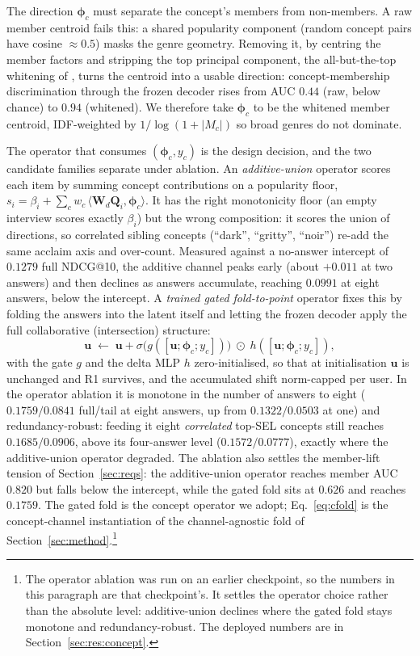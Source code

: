 \documentclass[manuscript,screen,review]{acmart}
\newcommand{\Q}{\mathbf{Q}}
\newcommand{\W}{\mathbf{W}}
\newcommand{\uu}{\mathbf{u}}
\newcommand{\bphi}{\boldsymbol{\phi}}
\begin{document}
The direction $\bphi_c$ must separate the concept's members from non-members. A raw member centroid fails this: a shared popularity component (random concept pairs have cosine $\approx 0.5$) masks the genre geometry. Removing it, by centring the member factors and stripping the top principal component, the all-but-the-top whitening of \citet{mu2018allbutthetop}, turns the centroid into a usable direction: concept-membership discrimination through the frozen decoder rises from AUC $0.44$ (raw, below chance) to $0.94$ (whitened). We therefore take $\bphi_c$ to be the whitened member centroid, IDF-weighted by $1/\log(1+|M_c|)$ so broad genres do not dominate.

The operator that consumes $(\bphi_c,y_c)$ is the design decision, and the two candidate families separate under ablation. An \emph{additive-union} operator scores each item by summing concept contributions on a popularity floor, $s_i=\beta_i+\sum_c w_c\,\langle \W_d\Q_i,\bphi_c\rangle$. It has the right monotonicity floor (an empty interview scores exactly $\beta_i$) but the wrong composition: it scores the union of directions, so correlated sibling concepts (``dark'', ``gritty'', ``noir'') re-add the same acclaim axis and over-count. Measured against a no-answer intercept of $0.1279$ full NDCG@10, the additive channel peaks early (about $+0.011$ at two answers) and then declines as answers accumulate, reaching $0.0991$ at eight answers, below the intercept. A \emph{trained gated fold-to-point} operator fixes this by folding the answers into the latent itself and letting the frozen decoder apply the full collaborative (intersection) structure:
\begin{equation}\label{eq:cfold}
  \uu \;\leftarrow\; \uu + \sigma\!\bigl(g([\uu;\bphi_c;y_c])\bigr)\;\odot\;h([\uu;\bphi_c;y_c]),
\end{equation}
with the gate $g$ and the delta MLP $h$ zero-initialised, so that at initialisation $\uu$ is unchanged and R1 survives, and the accumulated shift norm-capped per user. In the operator ablation it is monotone in the number of answers to eight ($0.1759/0.0841$ full/tail at eight answers, up from $0.1322/0.0503$ at one) and redundancy-robust: feeding it eight \emph{correlated} top-SEL concepts still reaches $0.1685/0.0906$, above its four-answer level ($0.1572/0.0777$), exactly where the additive-union operator degraded. The ablation also settles the member-lift tension of Section~\ref{sec:reqs}: the additive-union operator reaches member AUC $0.820$ but falls below the intercept, while the gated fold sits at $0.626$ and reaches $0.1759$. The gated fold is the concept operator we adopt; Eq.~\eqref{eq:cfold} is the concept-channel instantiation of the channel-agnostic fold of Section~\ref{sec:method}.\footnote{The operator ablation was run on an earlier checkpoint, so the numbers in this paragraph are that checkpoint's. It settles the operator choice rather than the absolute level: additive-union declines where the gated fold stays monotone and redundancy-robust. The deployed numbers are in Section~\ref{sec:res:concept}.}
\end{document}
